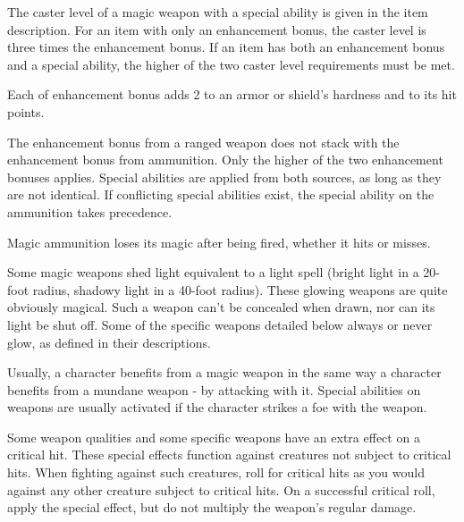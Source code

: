  The caster level of a magic weapon with a special ability is given in the item description. For an item with only an enhancement bonus, the caster level is three times the enhancement bonus. If an item has both an enhancement bonus and a special ability, the higher of the two caster level requirements must be met.

 Each  of enhancement bonus adds 2 to an armor or shield's hardness and  to its hit points.

 The enhancement bonus from a ranged weapon does not stack with the enhancement bonus from ammunition. Only the higher of the two enhancement bonuses applies. Special abilities are applied from both sources, as long as they are not identical. If conflicting special abilities exist, the special ability on the ammunition takes precedence.

Magic ammunition loses its magic after being fired, whether it hits or misses.

 Some magic weapons shed light equivalent to a light spell (bright light in a 20-foot radius, shadowy light in a 40-foot radius). These glowing weapons are quite obviously magical. Such a weapon can't be concealed when drawn, nor can its light be shut off. Some of the specific weapons detailed below always or never glow, as defined in their descriptions.

 Usually, a character benefits from a magic weapon in the same way a character benefits from a mundane weapon - by attacking with it. Special abilities on weapons are usually activated if the character strikes a foe with the weapon.

 Some weapon qualities and some specific weapons have an extra effect on a critical hit. These special effects function against creatures not subject to critical hits. When fighting against such creatures, roll for critical hits as you would against any other creature subject to critical hits. On a successful critical roll, apply the special effect, but do not multiply the weapon's regular damage.

